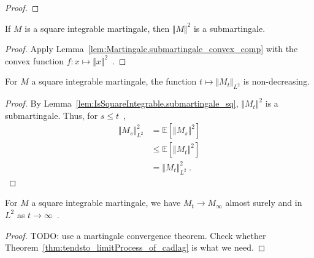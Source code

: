 \begin{proof}
\end{proof}


\begin{lemma}\label{lem:IsSquareIntegrable.submartingale_sq}
  \leanok
If $M$ is a square integrable martingale, then $\Vert M \Vert^2$ is a submartingale.
\end{lemma}

\begin{proof}
  \leanok
Apply Lemma~\ref{lem:Martingale.submartingale_convex_comp} with the convex function $f: x \mapsto \Vert x \Vert^2$~.
\end{proof}


\begin{lemma}\label{lem:IsSquareIntegrable.eLpNorm_two_mono}
  \leanok
For $M$ a square integrable martingale, the function $t \mapsto \Vert M_t \Vert_{L^2}$ is non-decreasing.
\end{lemma}

\begin{proof}
  \leanok
By Lemma~\ref{lem:IsSquareIntegrable.submartingale_sq}, $\Vert M_t \Vert^2$ is a submartingale.
Thus, for $s \le t$~,
\begin{align*}
  \Vert M_s \Vert_{L^2}^2
  &= \mathbb{E}[\Vert M_s \Vert^2]
  \\
  &\le \mathbb{E}[\Vert M_t \Vert^2]
  \\
  &= \Vert M_t \Vert_{L^2}^2
  \: .
\end{align*}
\end{proof}


\begin{lemma}\label{lem:IsSquareIntegrable.tendsto_limitProcess}
  \leanok
For $M$ a square integrable martingale, we have $M_t \to M_\infty$ almost surely and in $L^2$ as $t \to \infty$~.
\end{lemma}

\begin{proof}
TODO: use a martingale convergence theorem. Check whether Theorem~\ref{thm:tendsto_limitProcess_of_cadlag} is what we need.
\end{proof}


